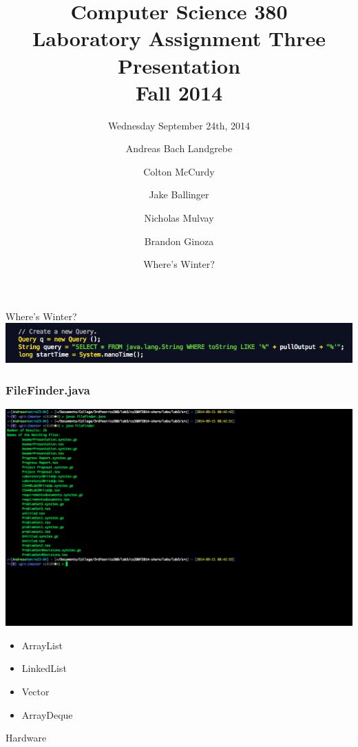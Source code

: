 \documentclass{beamer}
\title[Crisis] %
{Computer Science 380 \\ Laboratory Assignment Three Presentation \\ Fall 2014}
\subtitle{Wednesday September 24th, 2014}
\author[Andreas Bach Landgrebe, Colton McCurdy, Jake Ballinger, Nicholas Mulvay, Brandon Ginoza] %
{Andreas Bach Landgrebe\inst{1} \and Colton McCurdy\inst{1}\\ \and Jake Ballinger\inst{1} \and Nicholas Mulvay\inst{1}\\ \and Brandon Ginoza\inst{1}}
\institute[Allegheny College, Department of Computer Science] %
{
  \inst{1}%
  Allegheny College\\
  Department of Computer Science
}
\date[September 24, 2014] %
{Where's Winter?}
\begin{document}
\frame{\titlepage}

\begin{frame}
\begin{center} 
\Huge Where's Winter?
	\includegraphics[scale=0.5]{JoSPLStatements.png}
\end{center}
\end{frame}
\begin{frame}
\begin{center}
\frametitle{FileFinder.java}
\end{center}
\begin{center}
  \includegraphics[scale=0.35]{Andreas.png}

\end{center}

\end{frame}
\begin{frame}
\begin{itemize}
\item ArrayList
\item LinkedList
\item Vector
\item ArrayDeque
\\
\end{itemize}
\begin{center}
\Huge Hardware
\end{center}

\end{frame}
\end{document}
